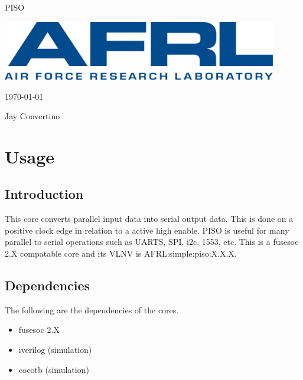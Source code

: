 \begin{titlepage}
  \begin{center}

  {\Huge PISO}

  \vspace{25mm}

  \includegraphics[width=0.90\textwidth,height=\textheight,keepaspectratio]{img/AFRL.png}

  \vspace{25mm}

  \today

  \vspace{15mm}

  {\Large Jay Convertino}

  \end{center}
\end{titlepage}

\tableofcontents

\newpage

\section{Usage}

\subsection{Introduction}

\par
This core converts parallel input data into serial output data. This is done on a positive clock edge in relation to a active high enable. PISO is useful for many parallel to serial operations such as UARTS, SPI, i2c, 1553, etc. This is a fusesoc 2.X compatable core and its VLNV is AFRL:simple:piso:X.X.X.
\subsection{Dependencies}

\par
The following are the dependencies of the cores.

\begin{itemize}
  \item fusesoc 2.X
  \item iverilog (simulation)
  \item cocotb (simulation)
\end{itemize}

